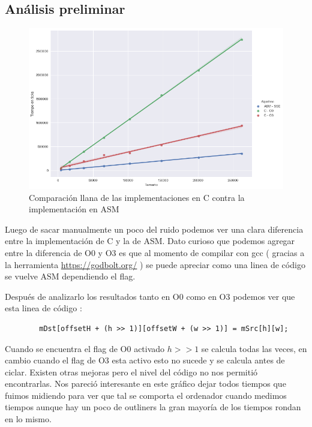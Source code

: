\subsection{Análisis preliminar}

\begin{figure}[H]
	\centering
	\includegraphics[scale=0.5]{img/fourCombine_CvsASMvsO3.png}
	\caption{Comparación llana de las implementaciones en C contra la implementación en ASM}
\end{figure}

Luego de sacar manualmente un poco del ruido podemos ver una clara diferencia entre la implementación de C y la de ASM. Dato curioso que podemos agregar entre la diferencia de O0 y O3 es que al momento de compilar con gcc ( gracias a la herramienta \url{https://godbolt.org/} ) se puede apreciar como una linea de código se vuelve ASM dependiendo el flag. 

Después de analizarlo los resultados tanto en O0 como en O3 podemos ver que esta linea de código :

\begin{lstlisting}
		mDst[offsetH + (h >> 1)][offsetW + (w >> 1)] = mSrc[h][w];
\end{lstlisting}

Cuando se encuentra el flag de O0 activado $h >> 1$ se calcula todas las veces, en cambio cuando el flag de O3 esta activo esto no sucede y se calcula antes de ciclar. Existen otras mejoras pero el nivel del código no nos permitió encontrarlas. Nos pareció interesante en este gráfico dejar todos tiempos que fuimos midiendo para ver que tal se comporta el ordenador cuando medimos tiempos aunque hay un poco de outliners la gran mayoría de los tiempos rondan en lo mismo.

